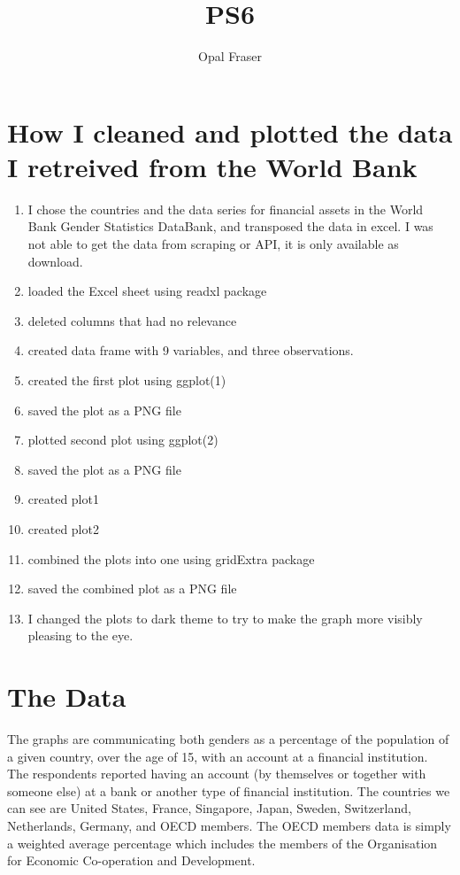\documentclass{article}
\title{PS6}
\author{Opal Fraser}
\begin{document}
\maketitle

\section{How I cleaned and plotted the data I retreived from the World Bank}
\begin{enumerate}

\item I chose the countries and the data series for financial assets in the World Bank Gender Statistics DataBank, and transposed the data in excel. I was not able to get the data from scraping or API, it is only available as download. 
\item loaded the Excel sheet using readxl package
\item deleted columns that had no relevance
\item created data frame with 9 variables, and three observations. 
 \item created the first plot using ggplot(1)
 \item saved the plot as a PNG file
 \item plotted second plot using ggplot(2)
 \item saved the plot as a PNG file
 \item created plot1
 \item created plot2
 \item combined the plots into one using gridExtra package
 \item saved the combined plot as a PNG file 
 \item I changed the plots to dark theme to try to make the graph more visibly pleasing to the eye. 
 \end{enumerate} 

\section{The Data}
The graphs are communicating both genders as a percentage of the population of a given country, over the age of 15, with an account at a financial institution. The respondents reported having an account (by themselves or together with someone else) at a bank or another type of financial institution.  The countries we can see are United States, France, Singapore, Japan, Sweden, Switzerland, Netherlands, Germany, and OECD members. The OECD members data is simply a weighted average percentage which includes the members of the Organisation for Economic Co-operation and Development. 
\end{document}
